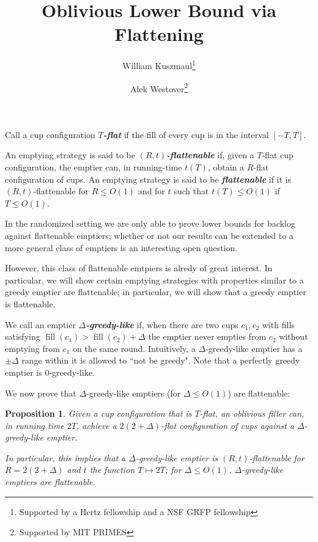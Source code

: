 \documentclass[twocolumn]{article}[10pt]
\title{Oblivious Lower Bound via Flattening}
\date{\vspace{-5ex}}
\author[1]{\small William Kuszmaul\thanks{Supported by a Hertz fellowship and a NSF GRFP fellowship}}
\author[2]{\small Alek Westover\thanks{Supported by MIT PRIMES}}
\affil[ ]{\footnotesize MIT\textsuperscript{1}, MIT PRIMES\textsuperscript{2}}
\affil[ ]{\textit{kuszmaul@mit.edu, alek.westover@gmail.com}}
\newcommand{\defn}[1]{{\textit{\textbf{\boldmath #1}}}\xspace}
\DeclareMathOperator{\fil}{\text{fill}}
\newtheorem{proposition}{Proposition}
\begin{document}
\maketitle

Call a cup configuration $T$\defn{-flat} if the fill of every cup is in the
interval $[-T, T]$.

An emptying strategy is said to be $(R, t)$\defn{-flattenable} if, given a
$T$-flat cup configuration, the emptier can, in running-time $t(T)$, obtain a
$R$-flat configuration of cups. An emptying strategy is said to be
\defn{flattenable} if it is $(R, t)$-flattenable for $R\le O(1)$ and for $t$
such that $t(T) \le O(1)$ if $T\le O(1)$.

In the randomized setting we are only able to prove lower bounds for backlog
against flattenable emptiers; whether or not our results can be extended to a
more general class of emptiers is an interesting open question. 

However, this class of flattenable emtpiers is alredy of great interest. 
In particular, we will show certain emptying strategies with properties similar
to a greedy emptier are flattenable; in particular, we will show that a greedy
emptier is flattenable.

We call an emptier $\Delta$\defn{-greedy-like} if, when there are two cups
$c_1, c_2$ with fills satisfying $\fil(c_1) > \fil(c_2) + \Delta$ the emptier
never empties from $c_2$ without emptying from $c_1$ on the same round.
Intuitively, a $\Delta$-greedy-like emptier has a $\pm \Delta$ range within it
is allowed to ``not be greedy". Note that a perfectly greedy emptier is
$0$-greedy-like.

We now prove that $\Delta$-greedy-like emptiers (for $\Delta \le O(1)$) are flattenable: 
\begin{proposition}
  \label{prop:greedylikeisflat}
  Given a cup configuration that is $T$-flat, an oblivious filler can, in
  running time $2T$, achieve a $2(2+\Delta)$-flat configuration of cups against
  a $\Delta$-greedy-like emptier. 

  In particular, this implies that a $\Delta$-greedy-like emptier is
  $(R,t)$-flattenable for $R = 2(2+\Delta)$ and $t$ the function $T\mapsto 2T$;
  for $\Delta\le O(1)$, $\Delta$-greedy-like emptiers are flattenable.
\end{proposition}
\end{document}
